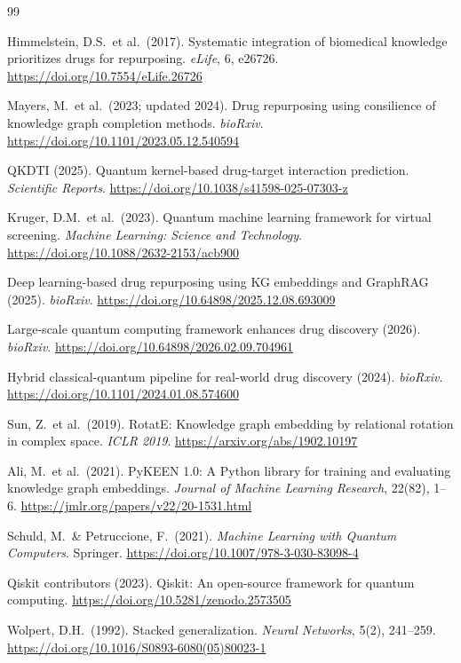 \documentclass[twocolumn,10pt]{article}
\begin{document}
\begin{thebibliography}{99}

Himmelstein, D.S.\ et al.\ (2017).
Systematic integration of biomedical knowledge prioritizes drugs for repurposing.
\textit{eLife}, 6, e26726.
\url{https://doi.org/10.7554/eLife.26726}

Mayers, M.\ et al.\ (2023; updated 2024).
Drug repurposing using consilience of knowledge graph completion methods.
\textit{bioRxiv}.
\url{https://doi.org/10.1101/2023.05.12.540594}

QKDTI (2025).
Quantum kernel-based drug-target interaction prediction.
\textit{Scientific Reports}.
\url{https://doi.org/10.1038/s41598-025-07303-z}

Kruger, D.M.\ et al.\ (2023).
Quantum machine learning framework for virtual screening.
\textit{Machine Learning: Science and Technology}.
\url{https://doi.org/10.1088/2632-2153/acb900}

Deep learning-based drug repurposing using KG embeddings and GraphRAG (2025).
\textit{bioRxiv}.
\url{https://doi.org/10.64898/2025.12.08.693009}

Large-scale quantum computing framework enhances drug discovery (2026).
\textit{bioRxiv}.
\url{https://doi.org/10.64898/2026.02.09.704961}

Hybrid classical-quantum pipeline for real-world drug discovery (2024).
\textit{bioRxiv}.
\url{https://doi.org/10.1101/2024.01.08.574600}

Sun, Z.\ et al.\ (2019).
RotatE: Knowledge graph embedding by relational rotation in complex space.
\textit{ICLR 2019}.
\url{https://arxiv.org/abs/1902.10197}

Ali, M.\ et al.\ (2021).
PyKEEN 1.0: A Python library for training and evaluating knowledge graph embeddings.
\textit{Journal of Machine Learning Research}, 22(82), 1--6.
\url{https://jmlr.org/papers/v22/20-1531.html}

Schuld, M.\ \& Petruccione, F.\ (2021).
\textit{Machine Learning with Quantum Computers}.
Springer.
\url{https://doi.org/10.1007/978-3-030-83098-4}

Qiskit contributors (2023).
Qiskit: An open-source framework for quantum computing.
\url{https://doi.org/10.5281/zenodo.2573505}

Wolpert, D.H.\ (1992).
Stacked generalization.
\textit{Neural Networks}, 5(2), 241--259.
\url{https://doi.org/10.1016/S0893-6080(05)80023-1}


\end{thebibliography}
\end{document}
